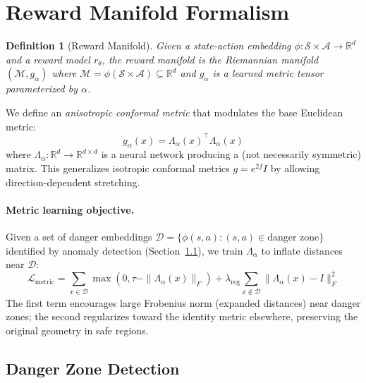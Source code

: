 \documentclass{article}
\newtheorem{definition}{Definition}
\begin{document}
\section{Reward Manifold Formalism}
\label{sec:reward_manifold}

\begin{definition}[Reward Manifold]
\label{def:reward_manifold}
Given a state-action embedding $\phi: \mathcal{S} \times \mathcal{A} \to \mathbb{R}^d$ and a reward model $r_\theta$, the \emph{reward manifold} is the Riemannian manifold $(\mathcal{M}, g_\alpha)$ where $\mathcal{M} = \phi(\mathcal{S} \times \mathcal{A}) \subseteq \mathbb{R}^d$ and $g_\alpha$ is a learned metric tensor parameterized by $\alpha$.
\end{definition}

We define an \emph{anisotropic conformal metric} that modulates the base Euclidean metric:
\begin{equation}
    g_\alpha(x) = \Lambda_\alpha(x)^\top \Lambda_\alpha(x)
\label{eq:metric}
\end{equation}
where $\Lambda_\alpha: \mathbb{R}^d \to \mathbb{R}^{d \times d}$ is a neural network producing a (not necessarily symmetric) matrix. This generalizes isotropic conformal metrics $g = e^{2f} I$ by allowing direction-dependent stretching.

\paragraph{Metric learning objective.} Given a set of danger embeddings $\mathcal{D} = \{\phi(s, a) : (s, a) \in \text{danger zone}\}$ identified by anomaly detection (Section~\ref{sec:danger_detection}), we train $\Lambda_\alpha$ to inflate distances near $\mathcal{D}$:
\begin{equation}
    \mathcal{L}_\text{metric} = \sum_{x \in \mathcal{D}} \max\left(0, \tau - \|\Lambda_\alpha(x)\|_F\right) + \lambda_\text{reg} \sum_{x \notin \mathcal{D}} \|\Lambda_\alpha(x) - I\|_F^2
\label{eq:metric_loss}
\end{equation}
The first term encourages large Frobenius norm (expanded distances) near danger zones; the second regularizes toward the identity metric elsewhere, preserving the original geometry in safe regions.

\subsection{Danger Zone Detection}
\label{sec:danger_detection}
\end{document}
